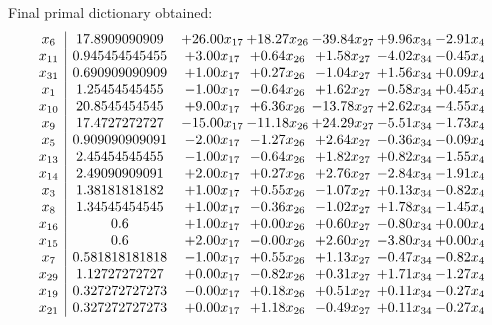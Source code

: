 \documentclass[8pt]{article}
\begin{document}
 Final primal dictionary obtained: 
\[\begin{array}{c| c c@{\hskip 2pt} c@{\hskip 2pt} c@{\hskip 2pt} c@{\hskip 2pt} c@{\hskip 2pt} }
 x_{6}   &  17.8909090909 & + 26.00 x_{17} & + 18.27 x_{26} & -39.84 x_{27} & +  9.96 x_{34} & -2.91 x_{4}\\
 x_{11}   &  0.945454545455 & +  3.00 x_{17} & +  0.64 x_{26} & +  1.58 x_{27} & -4.02 x_{34} & -0.45 x_{4}\\
 x_{31}   &  0.690909090909 & +  1.00 x_{17} & +  0.27 x_{26} & -1.04 x_{27} & +  1.56 x_{34} & +  0.09 x_{4}\\
 x_{1}   &  1.25454545455 & -1.00 x_{17} & -0.64 x_{26} & +  1.62 x_{27} & -0.58 x_{34} & +  0.45 x_{4}\\
 x_{10}   &  20.8545454545 & +  9.00 x_{17} & +  6.36 x_{26} & -13.78 x_{27} & +  2.62 x_{34} & -4.55 x_{4}\\
 x_{9}   &  17.4727272727 & -15.00 x_{17} & -11.18 x_{26} & + 24.29 x_{27} & -5.51 x_{34} & -1.73 x_{4}\\
 x_{5}   &  0.909090909091 & -2.00 x_{17} & -1.27 x_{26} & +  2.64 x_{27} & -0.36 x_{34} & -0.09 x_{4}\\
 x_{13}   &  2.45454545455 & -1.00 x_{17} & -0.64 x_{26} & +  1.82 x_{27} & +  0.82 x_{34} & -1.55 x_{4}\\
 x_{14}   &  2.49090909091 & +  2.00 x_{17} & +  0.27 x_{26} & +  2.76 x_{27} & -2.84 x_{34} & -1.91 x_{4}\\
 x_{3}   &  1.38181818182 & +  1.00 x_{17} & +  0.55 x_{26} & -1.07 x_{27} & +  0.13 x_{34} & -0.82 x_{4}\\
 x_{8}   &  1.34545454545 & +  1.00 x_{17} & -0.36 x_{26} & -1.02 x_{27} & +  1.78 x_{34} & -1.45 x_{4}\\
 x_{16}   &  0.6 & +  1.00 x_{17} & +  0.00 x_{26} & +  0.60 x_{27} & -0.80 x_{34} & +  0.00 x_{4}\\
 x_{15}   &  0.6 & +  2.00 x_{17} & -0.00 x_{26} & +  2.60 x_{27} & -3.80 x_{34} & +  0.00 x_{4}\\
 x_{7}   &  0.581818181818 & -1.00 x_{17} & +  0.55 x_{26} & +  1.13 x_{27} & -0.47 x_{34} & -0.82 x_{4}\\
 x_{29}   &  1.12727272727 & +  0.00 x_{17} & -0.82 x_{26} & +  0.31 x_{27} & +  1.71 x_{34} & -1.27 x_{4}\\
 x_{19}   &  0.327272727273 & -0.00 x_{17} & +  0.18 x_{26} & +  0.51 x_{27} & +  0.11 x_{34} & -0.27 x_{4}\\
 x_{21}   &  0.327272727273 & +  0.00 x_{17} & +  1.18 x_{26} & -0.49 x_{27} & +  0.11 x_{34} & -0.27 x_{4}\\

\end{array}\]
\end{document}
